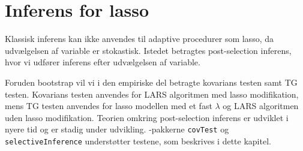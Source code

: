 \chapter{Inferens for lasso} \label{kap:statistisk_inferens}
Klassisk inferens kan ikke anvendes til adaptive procedurer som lasso, da udvælgelsen af variable er stokastisk.
Istedet betragtes post-selection inferens, hvor vi udfører inferens efter udvælgelsen af variable.

Foruden bootstrap vil vi i den empiriske del betragte kovarians testen samt TG testen.
Kovarians testen anvendes for LARS algoritmen med lasso modifikation, mens TG testen anvendes for lasso modellen med et fast \(\lambda\) og LARS algoritmen uden lasso modifikation.
Teorien omkring post-selection inferens er udviklet i nyere tid og er stadig under udvikling.
\Rlang-pakkerne \texttt{covTest} og \texttt{selectiveInference} understøtter testene, som beskrives i dette kapitel.







